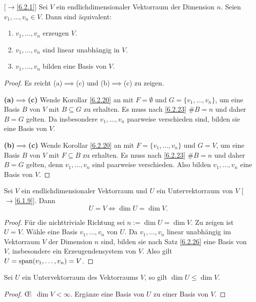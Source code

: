 \documentclass[../../main.tex]{subfiles}
\begin{document}
\begin{sat}\mbox{}{\rm[$\to$\ref{6.2.1}]}\label{6.2.26}
Sei $V$ ein endlichdimensionaler Vektorraum der Dimension $n$. Seien $v_1,\dots,v_n\in V$. Dann sind äquivalent:
\begin{enumerate}[\rm(a)]
\item $v_1,\dots,v_n$ erzeugen $V$.
\item $v_1,\dots,v_n$ sind linear unabhängig in $V$.
\item $v_1,\dots,v_n$ bilden eine Basis von $V$.
\end{enumerate}
\end{sat}
\begin{proof}
Es reicht (a)$\implies$(c) und (b)$\implies$(c) zu zeigen.

\medskip\noindent
{\bf (a)$\implies$(c)} Wende Korollar \ref{6.2.20} an mit $F=\emptyset$ und $G=\{v_1,\dots,v_n\}$, um eine Basis $B$ von $V$ mit $B\subseteq G$ zu erhalten. Es muss
nach \ref{6.2.23} $\#B=n$ und daher $B=G$ gelten. Da insbesondere $v_1,\dots,v_n$ paarweise verschieden sind, bilden sie eine Basis von $V$.

\medskip\noindent
{\bf (b)$\implies$(c)} Wende Korollar \ref{6.2.20} an mit $F=\{v_1,\dots,v_n\}$ und $G=V$, um eine Basis $B$ von $V$ mit $F\subseteq B$ zu erhalten. Es muss
nach \ref{6.2.23} $\#B=n$ und daher $B=G$ gelten, denn $v_1,\dots,v_n$ sind paarweise verschieden. Also bilden $v_1,\dots,v_n$ eine Basis von $V$.
\end{proof}


\begin{kor}\label{6.2.27}
Sei $V$ ein endlichdimensionaler Vektorraum und $U$ ein Untervektorraum von $V$ {\rm[$\to$\ref{6.1.9}]}. Dann
$$U=V\iff\dim U=\dim V.$$
\end{kor}
\begin{proof}
Für die nichttriviale Richtung sei $n:=\dim U=\dim V$. Zu zeigen ist $U=V$. Wähle eine Basis $v_1,\dots,v_n$ von $U$. Da $v_1,\dots,v_n$ linear unabhängig im Vektorraum $V$
der Dimension $n$ sind, bilden sie nach Satz \ref{6.2.26} eine Basis von $V$, insbesondere ein Erzeugendensystem von $V$. Also gilt $U=\operatorname{span}(v_1,\dots,v_n)=V$.
\end{proof}

\begin{pro}\label{6.2.28}
Sei $U$ ein Untervektorraum des Vektorraums $V$, so gilt $\dim U\le\dim V$.
\end{pro}
\begin{proof}
\OE\ $\dim V<\infty$. Ergänze eine Basis von $U$ zu einer Basis von $V$.
\end{proof}
\end{document}
